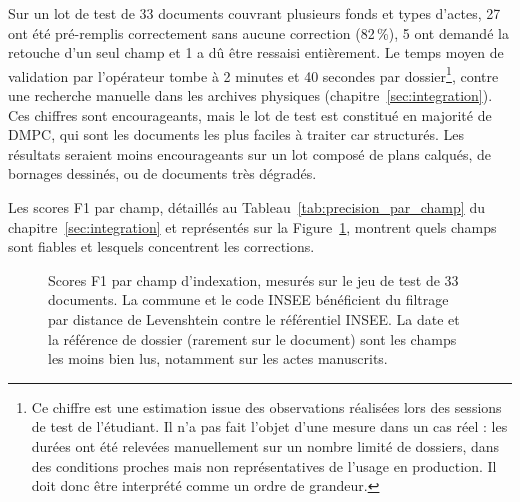 Sur un lot de test de 33 documents couvrant plusieurs fonds et types d'actes, 27 ont été pré-remplis correctement sans aucune correction (82\,\%), 5 ont demandé la retouche d'un seul champ et 1 a dû être ressaisi entièrement. Le temps moyen de validation par l'opérateur tombe à 2 minutes et 40 secondes par dossier\footnote{Ce chiffre est une estimation issue des observations réalisées lors des sessions de test de l'étudiant. Il n'a pas fait l'objet d'une mesure dans un cas réel : les durées ont été relevées manuellement sur un nombre limité de dossiers, dans des conditions proches mais non représentatives de l'usage en production. Il doit donc être interprété comme un ordre de grandeur.}, contre une recherche manuelle dans les archives physiques (chapitre~\ref{sec:integration}). Ces chiffres sont encourageants, mais le lot de test est constitué en majorité de DMPC, qui sont les documents les plus faciles à traiter car structurés. Les résultats seraient moins encourageants sur un lot composé de plans calqués, de bornages dessinés, ou de documents très dégradés.

Les scores F1 par champ, détaillés au Tableau~\ref{tab:precision_par_champ} du chapitre~\ref{sec:integration} et représentés sur la Figure~\ref{fig:f1_par_champ}, montrent quels champs sont fiables et lesquels concentrent les corrections.

\begin{figure}[H]
  \centering
  \caption{Scores F1 par champ d'indexation, mesurés sur le jeu de test de 33 documents. La commune et le code INSEE bénéficient du filtrage par distance de Levenshtein contre le référentiel INSEE. La date et la référence de dossier (rarement sur le document) sont les champs les moins bien lus, notamment sur les actes manuscrits.}
  \label{fig:f1_par_champ}
\end{figure}

